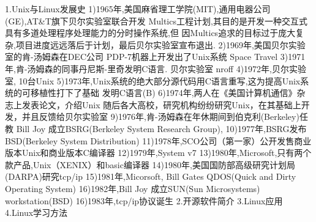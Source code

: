 1.Unix与Linux发展史
1)1965年,美国麻省理工学院(MIT),通用电器公司(GE),AT&T旗下贝尔实验室联合开发
Multics工程计划,其目的是开发一种交互式具有多道处理程序处理能力的分时操作系统,但
因Multics追求的目标过于庞大复杂,项目进度远远落后于计划，最后贝尔实验室宣布退出.
2)1969年,美国贝尔实验室的肯-汤姆森在DEC公司 PDP-7机器上开发出了Unix系统
    Space Travel
3)1971年,肯-汤姆森的同事丹尼斯-里奇发明C语言.
    贝尔实验室 nroff
4)1972年,贝尔实验室, 10台Unix
5)1973年,Unix系统的绝大部分源代码用C语言重写,这为提高Unix系统的可移植性打下了基础
    发明C语言(B)
6)1974年,两人在《美国计算机通信》杂志上发表论文，介绍Unix
    随后各大高校，研究机构纷纷研究Unix，在其基础上开发，并且反馈给贝尔实验室
9)1976年,肯-汤姆森在年休期间到伯克利(Berkeley)任教
    Bill Joy 成立BSRG(Berkeley System Research Group),
10)1977年,BSRG发布BSD(Berkeley System Distribution)
11)1978年,SCO公司（第一家）公开发售商业版本Unix和商业版本C编译器
12)1979年,System v7
13)1980年,Microsoft,只有两个款产品,Unix（XENIX）和basic编译器
14)1980年,美国国防部高级研究计划局(DARPA)研究tcp/ip
15)1981年,Micorsoft, Bill Gates
    QDOS(Quick and Dirty Operating System)
16)1982年,Bill Joy 成立SUN(Sun Microsystems)
    workstation(BSD)
16)1983年,tcp/ip协议诞生
2.开源软件简介
3.Linux应用
4.Linux学习方法
